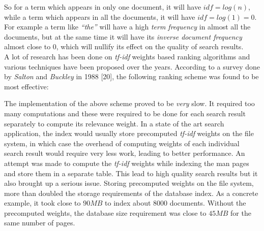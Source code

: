\documentclass[letterpaper,twocolumn,10pt]{article}
\begin{document}
\begin{description}
So for a term which appears in only one document, it will have
$idf = log(n)$,
while a term which appears in all the documents, it will have
$idf = log(1) = 0$.
For example a term like \textit{``the''} will have a high
\textit{term frequency} in almost all the
documents, but at the same time it will have its \textit{inverse document frequency} almost close to $0$, which will nullify its effect on the quality of search results. \\

A lot of research has been done on \textit{tf-idf} weights based ranking
algorithms and various techniques have been proposed over the years. According
to a survey done by \textit{Salton} and \textit{Buckley} in 1988 [20], the
following ranking scheme was found to be most effective:

\begin{center}
\end{center}

The implementation of the above scheme proved to be \emph{very} slow. It required
too many computations and these were required to be done for each
search result separately to compute its relevance weight. In a state of the
art search application, the index would usually store precomputed \textit{tf-idf}
weights on the file system, in which case the overhead of computing weights of
each individual search result would require very less work, leading to better
performance. An attempt was made to compute the \textit{tf-idf} weights while
indexing the man pages and store them in a separate table. This lead to high
quality search results but it also brought up a serious issue. Storing
precomputed weights on the file system, more than doubled the storage
requirements of the database index. As a concrete example, it took close
to $90 MB$ to index about $8000$ documents. Without the precomputed weights, 
the database size requirement was close to $45 MB$ for the same number of pages.
\end{description}
\end{document}
